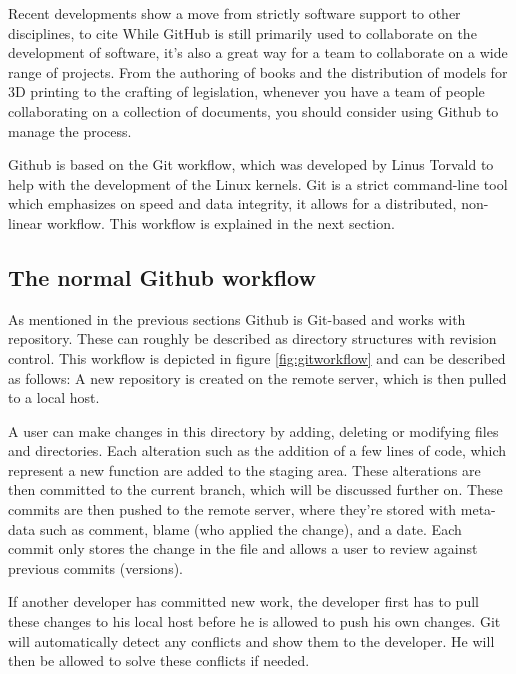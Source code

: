\documentclass[fleqn,10pt]{SelfArx} %
\begin{document}
Recent developments show a move from strictly software support to other disciplines, to cite \citeauthor{peter_bell_introducing_2015} \cite{peter_bell_introducing_2015} While GitHub is still primarily used to collaborate on the development of software, it’s also a great way for a team to collaborate on a wide range of projects. From the authoring of books and the distribution of models for 3D printing to the crafting of legislation, whenever you have a team of people collaborating on a collection of documents, you should consider using Github to manage the process.

Github is based on the Git workflow, which was developed by Linus Torvald to help with the development of the Linux kernels. Git is a strict command-line tool which emphasizes on speed and data integrity, it allows for a distributed, non-linear workflow. This workflow is explained in the next section.

\subsection{The normal Github workflow}\label{sec:nomal github workflow}
As mentioned in the previous sections Github is Git-based and works with repository. These can roughly be described as directory structures with revision control. This workflow is depicted in figure \ref{fig:gitworkflow} and can be described as follows: A new repository is created on the remote server, which is then pulled to a local host. 

A user can make changes in this directory by adding, deleting or modifying files and directories. Each alteration such as the addition of a few lines of code, which represent a new function are added to the staging area. These alterations are then committed to the current branch, which will be discussed further on. These commits are then pushed to the remote server, where they're stored with meta-data such as comment, blame (who applied the change), and a date. Each commit only stores the change in the file and allows a user to review against previous commits (versions). 

If another developer has committed new work, the developer first has to pull these changes to his local host before he is allowed to push his own changes. Git will automatically detect any conflicts and show them to the developer. He will then be allowed to solve these conflicts if needed.
\end{document}
